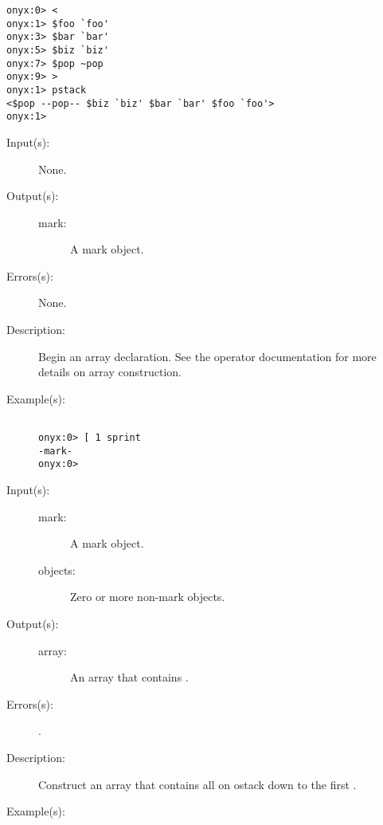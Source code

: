 \begin{description}
\begin{description}
\begin{verbatim}
onyx:0> <
onyx:1> $foo `foo'
onyx:3> $bar `bar'
onyx:5> $biz `biz'
onyx:7> $pop ~pop
onyx:9> >
onyx:1> pstack
<$pop --pop-- $biz `biz' $bar `bar' $foo `foo'>
onyx:1>
		\end{verbatim}
	\end{description}
\label{systemdict:sym_lb}
\index{[@\onyxop{}{{\lb}}{}}
\item[{\onyxop{--}{{\lb}}{mark}}: ]
	\begin{description}\item[]
	\item[Input(s): ] None.
	\item[Output(s): ]
		\begin{description}\item[]
		\item[mark: ]
			A mark object.
		\end{description}
	\item[Errors(s): ] None.
	\item[Description: ]
		Begin an array declaration.  See the
		\htmlref{\onyxop{}{]}{}}{systemdict:sym_rb} operator
		documentation for more details on array construction.
	\item[Example(s): ]\begin{verbatim}

onyx:0> [ 1 sprint
-mark-
onyx:0>
		\end{verbatim}
	\end{description}
\label{systemdict:sym_rb}
\index{]@\onyxop{}{{\rb}}{}}
\item[{\onyxop{mark objects}{{\rb}}{array}}: ]
	\begin{description}\item[]
	\item[Input(s): ]
		\begin{description}\item[]
		\item[mark: ]
			A mark object.
		\item[objects: ]
			Zero or more non-mark objects.
		\end{description}
	\item[Output(s): ]
		\begin{description}\item[]
		\item[array: ]
			An array that contains .
		\end{description}
	\item[Errors(s): ]
		\begin{description}\item[]
		\item[.]
		\end{description}
	\item[Description: ]
		Construct an array that contains all  on ostack
		down to the first .
	\item[Example(s): ]\begin{verbatim}


\end{verbatim}
\end{description}
\end{description}
